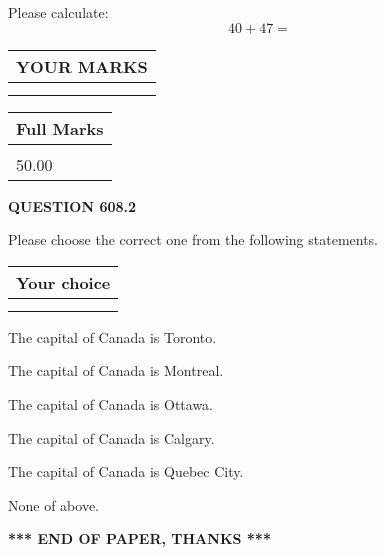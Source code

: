 \documentclass[12pt]{article}
\begin{document}
  
 
Please calculate:
\begin{equation}
40 +  %
47 = \nonumber
\end{equation}
 

 

 
  
\vspace{0.2in}
  
\noindent\begin{tabular}{|l|}
\hline
 YOUR MARKS  \\
\hline
 \\ 
 \\ 
\hline
\end{tabular}
\hspace{0.05in} \begin{tabular}{|l|}
\hline
 Full Marks  \\
\hline
 \\ 
50.00 \\
\hline
\end{tabular}
{\textbf{\Large{QUESTION
608.2 
}}}
  
  
Please choose the correct one from the following statements.
  
  
\noindent\hspace{3.0in} \begin{tabular}{|l|}
\hline
Your choice \\
\hline
 \\ 
 \\ 
\hline
\end{tabular}
  
  
 
 
The capital of Canada is Toronto.
 
 
The capital of Canada is Montreal.
 
 
The capital of Canada is Ottawa.
 
 
The capital of Canada is Calgary.
 
 
The capital of Canada is Quebec City.
 
 
 None of above.
 
 
   
   
 \vspace{0.2in}
 
   
   
   
   
\vspace{1.0in} 
{\textbf{\large{ *** END OF PAPER, THANKS *** }}} 
   
\end{document}
